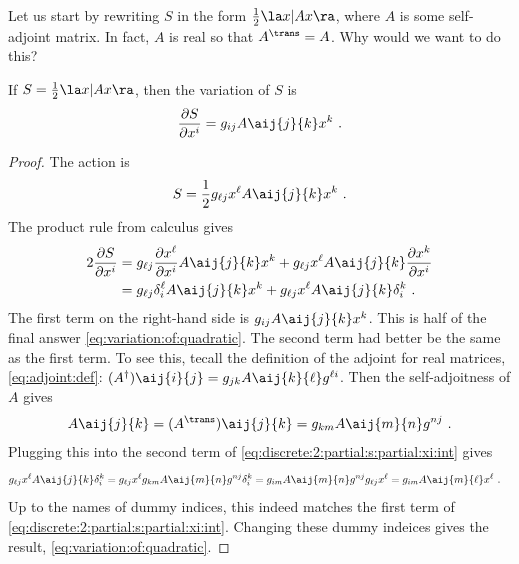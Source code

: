 Let us start by rewriting $S$ in the form $\frac{1}{2}\la x | A x \ra$, where $A$ is some self-adjoint matrix. In fact, $A$ is real so that $A^\trans = A$. Why would we want to do this? 
\begin{theorem}\label{thm:quadratic:action}
If $S=\frac{1}{2} \la x | A x \ra$, then the variation of $S$ is
\begin{align}
    \frac{\partial S}{\partial x^i}
    = 
    g_{ij}A\aij{j}{k}x^k \ .
    \label{eq:variation:of:quadratic}
\end{align}
\end{theorem}
\begin{proof}
The action is
\begin{align}
    S= \frac{1}{2}  g_{\ell j}x^\ell A\aij{j}{k}x^k \ .
\end{align}
The product rule from calculus gives
\begin{align}
    2 \frac{\partial S}{\partial x^i}
    &= 
    g_{\ell j}
    \frac{\partial x^\ell}{\partial x^i} A\aij{j}{k}x^k
    + 
    g_{\ell j} x^\ell A\aij{j}{k}
    \frac{\partial x^k}{\partial x^i}
    \\
    &=
    g_{\ell j}
    \delta^\ell_i A\aij{j}{k}x^k
    + 
    g_{\ell j} x^\ell A\aij{j}{k}
    \delta^k_i 
    \label{eq:discrete:2:partial:s:partial:xi:int}
    \ .
\end{align}
The first term on the right-hand side is 
$g_{i j} A\aij{j}{k}x^k$. This is half of the final answer \eqref{eq:variation:of:quadratic}. The second term had better be the same as the first term. To see this, tecall the definition of the adjoint for real matrices, \eqref{eq:adjoint:def}: $(A^\dag)\aij{i}{j} = g_{jk}A\aij{k}{\ell}g^{\ell i}$. Then the self-adjoitness of $A$ gives
\begin{align}
    A\aij{j}{k} = (A^\trans)\aij{j}{k}
    = g_{km}A\aij{m}{n}g^{nj} \ .
\end{align}
Plugging this into the second term of \eqref{eq:discrete:2:partial:s:partial:xi:int} gives
\begin{align}
    g_{\ell j} x^\ell A\aij{j}{k}
    \delta^k_i 
    &=
    g_{\ell j} x^\ell 
    g_{km}A\aij{m}{n}g^{nj}
    \delta^k_i 
    =
    g_{im}A\aij{m}{n}
    g^{nj}
    g_{\ell j} 
    x^\ell 
    =
    g_{im}A\aij{m}{\ell}
    x^\ell \ .
\end{align}
Up to the names of dummy indices, this indeed matches the first term of \eqref{eq:discrete:2:partial:s:partial:xi:int}. Changing these dummy indeices gives the result, \eqref{eq:variation:of:quadratic}.
\end{proof}


